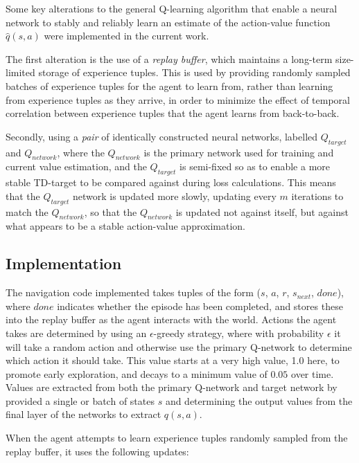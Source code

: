 \documentclass[11pt]{article}
\begin{document}
Some key alterations to the general Q-learning algorithm that enable a neural network to stably and reliably learn an estimate of the action-value function $\hat{q}(s, a)$ were implemented in the current work.

The first alteration is the use of a \textit{replay buffer}, which maintains a long-term size-limited storage of experience tuples. This is used by providing randomly sampled batches of experience tuples for the agent to learn from, rather than learning from experience tuples as they arrive, in order to minimize the effect of temporal correlation between experience tuples that the agent learns from back-to-back.

Secondly, using a \textit{pair} of identically constructed neural networks, labelled $Q_{target}$ and $Q_{network}$, where the $Q_{network}$ is the primary network used for training and current value estimation, and the $Q_{target}$ is semi-fixed so as to enable a more stable TD-target to be compared against during loss calculations. This means that the $Q_{target}$ network is updated more slowly, updating every $m$ iterations to match the $Q_{network}$, so that the $Q_{network}$ is updated not against itself, but against what appears to be a stable action-value approximation.


\subsection{Implementation}

The navigation code implemented takes tuples of the form ($s$, $a$, $r$, $s_{next}$, $done$), where $done$ indicates whether the episode has been completed, and stores these into the replay buffer as the agent interacts with the world. Actions the agent takes are determined by using an $\epsilon$-greedy strategy, where with probability $\epsilon$ it will take a random action and otherwise use the primary Q-network to determine which action it should take. This value starts at a very high value, 1.0 here, to promote early exploration, and decays to a minimum value of $0.05$ over time. Values are extracted from both the primary Q-network and target network by provided a single or batch of states $s$ and determining the output values from the final layer of the networks to extract $q(s, a)$.

When the agent attempts to learn experience tuples randomly sampled from the replay buffer, it uses the following updates:
\end{document}

